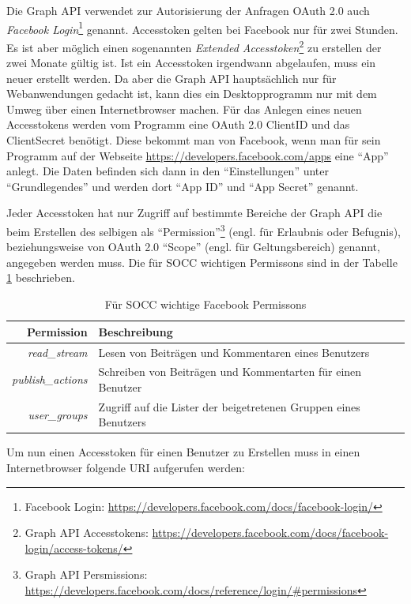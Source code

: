 Die Graph API verwendet zur Autorisierung der Anfragen OAuth 2.0 auch \emph{Facebook Login}\footnote{Facebook Login: \url{https://developers.facebook.com/docs/facebook-login/}} genannt. Accesstoken gelten bei Facebook nur für zwei Stunden. Es ist aber möglich einen sogenannten \emph{Extended Accesstoken}\footnote{Graph API Accesstokens: \url{https://developers.facebook.com/docs/facebook-login/access-tokens/}} zu erstellen der zwei Monate gültig ist. Ist ein Accesstoken irgendwann abgelaufen, muss ein neuer erstellt werden. Da aber die Graph API hauptsächlich nur für Webanwendungen gedacht ist, kann dies ein Desktopprogramm nur mit dem Umweg über einen Internetbrowser machen. Für das Anlegen eines neuen Accesstokens werden vom Programm eine OAuth 2.0 ClientID und das ClientSecret benötigt. Diese bekommt man von Facebook, wenn man für sein Programm auf der Webseite \url{https://developers.facebook.com/apps} eine \enquote{App} anlegt. Die Daten befinden sich dann in den \enquote{Einstellungen} unter \enquote{Grundlegendes} und werden dort \enquote{App ID} und \enquote{App Secret} genannt.

Jeder Accesstoken hat nur Zugriff auf bestimmte Bereiche der Graph API die beim Erstellen des selbigen als \enquote{Permission}\footnote{Graph API Persmissions: \url{https://developers.facebook.com/docs/reference/login/\#permissions}} (engl. für Erlaubnis oder Befugnis), beziehungsweise von OAuth 2.0 \enquote{Scope} (engl. für Geltungsbereich) genannt, angegeben werden muss. Die für SOCC wichtigen Permissons sind in der Tabelle \ref{tbl:socc_facebook_persmissons} beschrieben.

\begin{table}[ht]
    \centering
    \caption{Für SOCC wichtige Facebook Permissons}
    \begin{tabular}{r|p{10cm}}
        \textbf{Permission} & 
        \textbf{Beschreibung} \\ 
        \hline
        \textit{read\_stream} & 
        Lesen von Beiträgen und Kommentaren eines Benutzers \\
        \textit{publish\_actions} & 
        Schreiben von Beiträgen und Kommentarten für einen Benutzer \\
        \textit{user\_groups} & 
        Zugriff auf die Lister der beigetretenen Gruppen eines Benutzers
    \end{tabular}
    \label{tbl:socc_facebook_persmissons}
\end{table}

Um nun einen Accesstoken für einen Benutzer zu Erstellen muss in einen Internetbrowser folgende URI aufgerufen werden:

